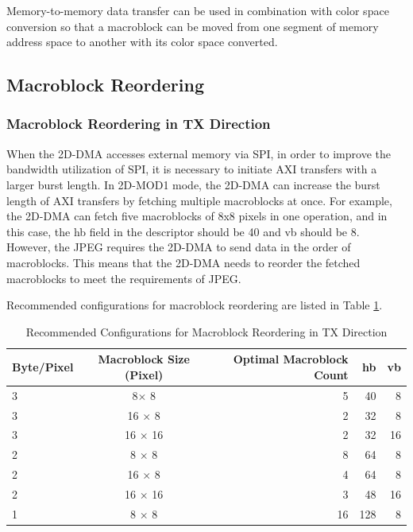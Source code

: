 \documentclass[main\_\_EN.tex]{subfiles}
\begin{document}
Memory-to-memory data transfer can be used in combination with color space conversion so that a macroblock can be moved from one segment of memory address space to another with its color space converted.


\subsection{Macroblock Reordering}

\subsubsection{Macroblock Reordering in TX Direction}

When the 2D-DMA accesses external memory via SPI, in order to improve the bandwidth utilization of SPI, it is necessary to initiate AXI transfers with a larger burst length. In 2D-MOD1 mode, the 2D-DMA can increase the burst length of AXI transfers by fetching multiple macroblocks at once. For example, the 2D-DMA can fetch five macroblocks of 8x8 pixels in one operation, and in this case, the hb field in the descriptor should be 40 and vb should be 8. However, the JPEG requires the 2D-DMA to send data in the order of macroblocks. This means that the 2D-DMA needs to reorder the fetched macroblocks to meet the requirements of JPEG.

Recommended configurations for macroblock reordering are listed in Table \ref{tab:ro_out_conf}.

\begin{longtable}[c]{|l|c|r|r|r|}
\caption{Recommended Configurations for Macroblock Reordering in TX Direction}
\label{tab:ro_out_conf}\\
\hline
    \rowcolor{lightgray}
    \textbf{Byte/Pixel} & \textbf{Macroblock Size (Pixel)} & \textbf{Optimal Macroblock Count} & \textbf{hb}  & \textbf{vb} \\\hline
    3          & 8$\times$ 8      & 5     & 40  & 8  \\ \hline
    3          & 16 $\times$ 8     & 2     & 32  & 8  \\ \hline
    3          & 16 $\times$ 16    & 2     & 32  & 16 \\ \hline
    2          & 8 $\times$ 8      & 8     & 64  & 8  \\ \hline
    2          & 16 $\times$ 8     & 4     & 64  & 8  \\ \hline
    2          & 16 $\times$ 16    & 3     & 48  & 16 \\ \hline
    1          & 8 $\times$ 8      & 16    & 128 & 8 \\ \hline
\end{longtable}
\end{document}
